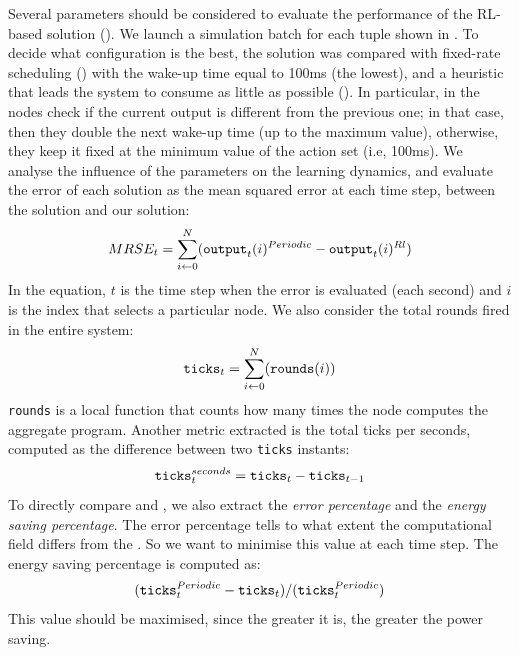 Several parameters should be considered to evaluate the performance of the \ac{RL}-based solution (\rlsol{}). 
%
We launch a simulation batch for each tuple shown in .
%
To decide what configuration is the best, 
 the \rlsol{} solution was compared with fixed-rate scheduling (\periodicsol{}) 
 with the wake-up time equal to 100ms (the lowest),
 and a heuristic that leads the system to consume as little as possible (\adhocsol{}).
%
In particular, in \adhocsol{} the nodes check if the current output is different from the previous one; 
 in that case, then they double the next wake-up time (up to the maximum value),
 otherwise, they keep it fixed at the minimum value of the action set (i.e, 100ms).
%
We analyse the influence of the parameters on the learning dynamics, 
 and evaluate the error of each solution as the mean squared error 
 at each time step, between the \periodicsol{} solution and our \rlsol{} solution:
%
\begin{equation}
    MRSE_t = \sum_{i \leftarrow 0}^N (\text{\texttt{output}}_t(i)^{Periodic} - \text{\texttt{output}}_t(i)^{Rl})
\end{equation}
In the equation, 
 $t$ is the time step when the error is evaluated 
 (each second) and $i$ is the index that selects a particular node.
%
We also consider the total rounds fired in the entire system:
\begin{equation}
    \text{\texttt{ticks}}_t = \sum_{i \leftarrow 0}^N (\text{\texttt{rounds}}(i))
\end{equation}
\texttt{rounds} is a local function that counts how many times the node computes the aggregate program. 
%
Another metric extracted is the total ticks per seconds, computed as the difference between two \texttt{ticks} instants: 
\begin{equation}
    \text{\texttt{ticks}}^{seconds}_t = \text{\texttt{ticks}}_t - \text{\texttt{ticks}}_{t-1}    
\end{equation}
%
To directly compare \rlsol{} and \adhocsol{}, 
 we also extract the \emph{error percentage} and the \emph{energy saving percentage}.
%
The error percentage tells to what extent the computational field differs from the \periodicsol{}. 
 So we want to minimise this value at each time step. 
 The energy saving percentage is computed as: 
\begin{equation}
(\text{\texttt{ticks}}^{Periodic}_t - \text{\texttt{ticks}}_t) / (\text{\texttt{ticks}}^{Periodic}_t)
\end{equation}
%
This value should be maximised, since the greater it is, the greater the power saving.

